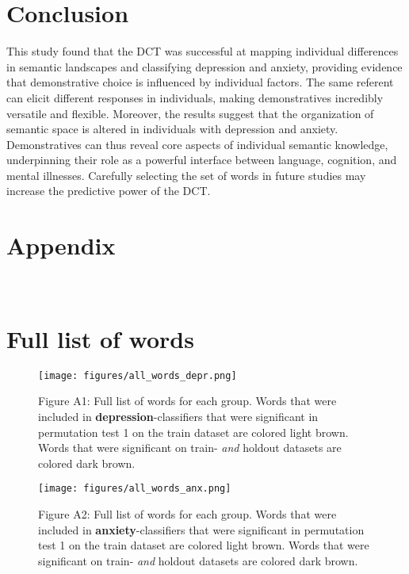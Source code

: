 \documentclass[11pt, a4paper]{article}
\begin{document}
\section{Conclusion}
This study found that the DCT was successful at mapping individual differences in semantic landscapes and classifying depression and anxiety, providing evidence that demonstrative choice is influenced by individual factors. The same referent can elicit different responses in individuals, making demonstratives incredibly versatile and flexible. Moreover, the results suggest that the organization of semantic space is altered in individuals with depression and anxiety. Demonstratives can thus reveal core aspects of individual semantic knowledge, underpinning their role as a powerful interface between language, cognition, and mental illnesses. Carefully selecting the set of words in future studies may increase the predictive power of the DCT. 


\renewenvironment{APACrefURL}[1][]{}{}
\renewcommand{\doiprefix}{doi:~\kern-1pt}
\nocite{*}

\newpage


\newpage

\section*{Appendix}
\appendix
\section{\\ Full list of words}

\begin{figure}[hbt!]
\centering
\vspace{-0.7cm}
\texttt{[image: figures/all\_words\_depr.png]}
\caption*{Figure A1: Full list of words for each group. Words that were included in \textbf{depression}-classifiers that were significant in permutation test 1 on the train dataset are colored light brown. Words that were significant on train- \textit{and} holdout datasets are colored dark brown.}
\end{figure}

\begin{figure}
\centering
\vspace{-0.7cm}
\texttt{[image: figures/all\_words\_anx.png]}
\caption*{Figure A2: Full list of words for each group. Words that were included in \textbf{anxiety}-classifiers that were significant in permutation test 1 on the train dataset are colored light brown. Words that were significant on train- \textit{and} holdout datasets are colored dark brown.}
\end{figure}
\end{document}
